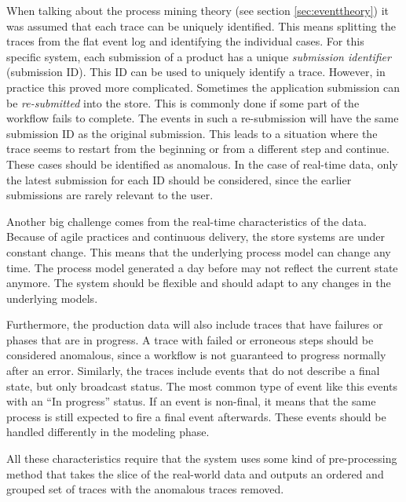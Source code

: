 When talking about the process mining theory (see section \ref{sec:eventtheory}) it was assumed that each trace can be uniquely identified.
This means splitting the traces from the flat event log and identifying the individual cases.
For this specific system, each submission of a product has a unique \emph{submission identifier} (submission ID).
This ID can be used to uniquely identify a trace.
However, in practice this proved more complicated.
Sometimes the application submission can be \textit{re-submitted} into the store.
This is commonly done if some part of the workflow fails to complete.
The events in such a re-submission will have the same submission ID as the original submission.
This leads to a situation where the trace seems to restart from the beginning or from a different step and continue. 
These cases should be identified as anomalous. 
In the case of real-time data, only the latest submission for each ID should be considered, since the earlier submissions are rarely relevant to the user.

Another big challenge comes from the real-time characteristics of the data. 
Because of agile practices and continuous delivery, the store systems are under constant change. 
This means that the underlying process model can change any time.
The process model generated a day before may not reflect the current state anymore. 
The system should be flexible and should adapt to any changes in the underlying models.

Furthermore, the production data will also include traces that have failures or phases that are in progress.
A trace with failed or erroneous steps should be considered anomalous, since a workflow is not guaranteed to progress normally after an error. 
Similarly, the traces include events that do not describe a final state, but only broadcast status. 
The most common type of event like this events with an ``In progress'' status.
If an event is non-final, it means that the same process is still expected to fire a final event afterwards.
These events should be handled differently in the modeling phase.

All these characteristics require that the system uses some kind of pre-processing method that takes the slice of the real-world data and outputs an ordered and grouped set of traces with the anomalous traces removed.

